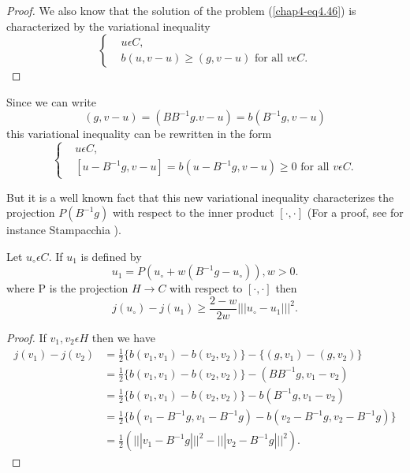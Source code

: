 \begin{proof}
We also know that the solution of the problem (\ref{chap4-eq4.46}) is characterized by the variational inequality
\begin{equation*}
\begin{cases}
& u \epsilon C,\\
& b(u, v-u) \geq (g, v-u) \text{ for all } v \epsilon C.\tag{4.51}\label{chap4-eq4.51}
\end{cases}
\end{equation*}
\end{proof}

Since we can write
\begin{equation*}
(g, v-u) = (B B^{-1} g. v-u) = b(B^{-1} g, v-u)\tag{4.52}\label{chap4-eq4.52}
\end{equation*}
this variational inequality can be rewritten in the form
\begin{equation*}
\begin{cases}
& u \epsilon C,\\
& [u - B^{-1} g, v-u] = b(u-B^{-1} g, v-u) \geq 0 \text{ for all } v \epsilon C.\tag*{$(4.51)'$}\label{chap4-eq4.51'}
\end{cases}
\end{equation*}\pageoriginale

But it is a well known fact that this new variational inequality characterizes the projection $P(B^{-1} g)$ with respect to the inner product $[\cdot , \cdot]$ (For a proof, see for instance Stampacchia \cite{key44}).

\begin{lemma}\label{chap4-lem4.2}
Let $u_{\circ} \epsilon C$. If $u_{1}$ is defined by
\begin{equation*}
u_{1} = P(u_{\circ} + w(B^{-1} g-u_{\circ})), w > 0.\tag{4.53}\label{chap4-eq4.53}
\end{equation*}
where P is the projection $H \to C$ with respect to $[\cdot , \cdot]$ then
\begin{equation*}
j(u_{\circ}) - j(u_{1}) \geq \dfrac{2-w}{2w} ||| u_{\circ} - u_{1} |||^{2}.\tag{4.54}\label{chap4-eq4.54}
\end{equation*} 
\end{lemma}

\begin{proof}
If $v_{1}, v_{2} \epsilon H$ then we have
\begin{align*}
j(v_{1}) -j(v_{2}) & = \frac{1}{2} \{b(v_{1}, v_{1}) -b(v_{2}, v_{2})\} - \{(g, v_{1}) - (g, v_{2})\}\\
                  & = \frac{1}{2} \{b(v_{1}, v_{1}) -b(v_{2}, v_{2})\} - (BB^{-1} g, v_{1} - v_{2})\\
                  & = \frac{1}{2} \{b(v_{1}, v_{1}) -b(v_{2}, v_{2})\} - b(B^{-1} g, v_{1} - v_{2})\\
                  & = \frac{1}{2} \{b(v_{1} - B^{-1} g, v_{1} - B^{-1} g) - b(v_{2}-B^{-1} g, v_{2} - B^{-1} g)\}\\
                  & = \frac{1}{2} (||| v_{1} - B^{-1} g |||^{2} - ||| v_{2} -B^{-1} g |||^{2}).
\end{align*}
\end{proof}

